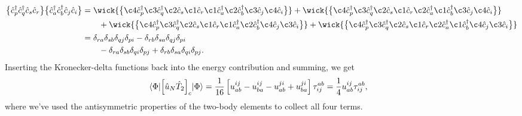         \begin{align}
            \normalord{
                \ccr{p}
                \ccr{q}
                \can{s}
                \can{r}
            }
            \normalord{
                \ccr{a}
                \ccr{b}
                \can{j}
                \can{i}
            }
            &=
            \wick{
                \normalord{
                    \c4 {\ccr{p}}
                    \c3 {\ccr{q}}
                    \c2 {\can{s}}
                    \c1 {\can{r}}
                    \c1 {\ccr{a}}
                    \c2 {\ccr{b}}
                    \c3 {\can{j}}
                    \c4 {\can{i}}
                }
            }
            +
            \wick{
                \normalord{
                    \c4 {\ccr{p}}
                    \c3 {\ccr{q}}
                    \c2 {\can{s}}
                    \c1 {\can{r}}
                    \c2 {\ccr{a}}
                    \c1 {\ccr{b}}
                    \c3 {\can{j}}
                    \c4 {\can{i}}
                }
            }
            \nonumber \\
            &\qquad
            +
            \wick{
                \normalord{
                    \c4 {\ccr{p}}
                    \c3 {\ccr{q}}
                    \c2 {\can{s}}
                    \c1 {\can{r}}
                    \c1 {\ccr{a}}
                    \c2 {\ccr{b}}
                    \c4 {\can{j}}
                    \c3 {\can{i}}
                }
            }
            +
            \wick{
                \normalord{
                    \c4 {\ccr{p}}
                    \c3 {\ccr{q}}
                    \c2 {\can{s}}
                    \c1 {\can{r}}
                    \c2 {\ccr{a}}
                    \c1 {\ccr{b}}
                    \c4 {\can{j}}
                    \c3 {\can{i}}
                }
            }
            \\
            &=
            \delta_{ra}
            \delta_{sb}
            \delta_{qj}
            \delta_{pi}
            -
            \delta_{rb}
            \delta_{sa}
            \delta_{qj}
            \delta_{pi}
            \nonumber \\
            &\qquad
            -
            \delta_{ra}
            \delta_{sb}
            \delta_{qi}
            \delta_{pj}
            +
            \delta_{rb}
            \delta_{sa}
            \delta_{qi}
            \delta_{pj}.
        \end{align}
        Inserting the Kronecker-delta functions back into the energy
        contribution and summing, we get
        \begin{align}
            \mel*{\Phi}{
                \left[ 
                    \hat{u}_N \hat{T}_2
                 \right]_c
            }{\Phi}
            &=
            \frac{1}{16}\left[ 
                u^{ij}_{ab}
                - u^{ij}_{ba}
                - u^{ji}_{ab}
                + u^{ji}_{ba}
             \right]\tau^{ab}_{ij}
            =
            \frac{1}{4}u^{ij}_{ab}\tau^{ab}_{ij},
        \end{align}
        where we've used the antisymmetric properties of the two-body
        elements to collect all four terms.

